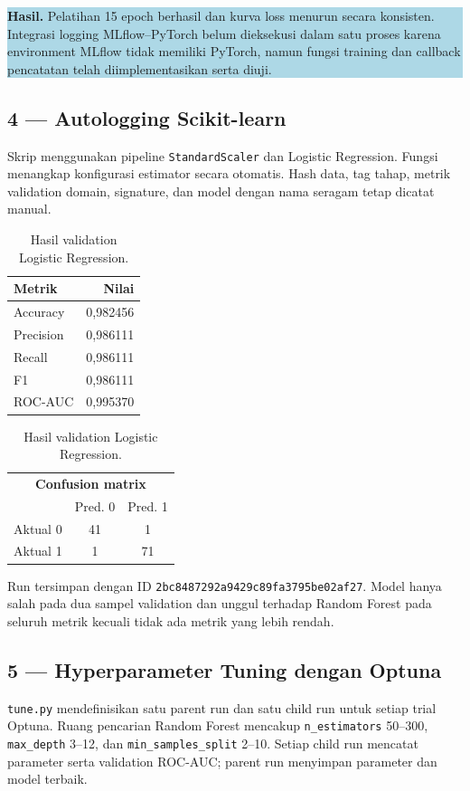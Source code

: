 \documentclass[11pt,a4paper]{article}
\newcommand{\resultbox}[1]{%
  \begin{center}
    \colorbox{lightblue}{\parbox{0.91\linewidth}{\textbf{Hasil.} #1}}
  \end{center}
}
\begin{document}
\resultbox{Pelatihan 15 epoch berhasil dan kurva loss menurun secara konsisten. Integrasi logging MLflow--PyTorch belum dieksekusi dalam satu proses karena environment MLflow tidak memiliki PyTorch, namun fungsi training dan callback pencatatan telah diimplementasikan serta diuji.}

\subsection{4 --- Autologging Scikit-learn}

Skrip  menggunakan pipeline \texttt{StandardScaler} dan Logistic Regression. Fungsi  menangkap konfigurasi estimator secara otomatis. Hash data, tag tahap, metrik validation domain, signature, dan model dengan nama seragam tetap dicatat manual.

\begin{table}[ht]
\centering
\caption{Hasil validation Logistic Regression.}
\begin{tabular}{lr}
\toprule
Metrik & Nilai \\
\midrule
Accuracy & 0,982456 \\
Precision & 0,986111 \\
Recall & 0,986111 \\
F1 & 0,986111 \\
ROC-AUC & 0,995370 \\
\bottomrule
\end{tabular}
\hspace{1.3cm}
\begin{tabular}{c|cc}
\multicolumn{3}{c}{\textbf{Confusion matrix}} \\
 & Pred. 0 & Pred. 1 \\
\hline
Aktual 0 & 41 & 1 \\
Aktual 1 & 1 & 71 \\
\end{tabular}
\end{table}

Run tersimpan dengan ID \texttt{2bc8487292a9429c89fa3795be02af27}. Model hanya salah pada dua sampel validation dan unggul terhadap Random Forest pada seluruh metrik kecuali tidak ada metrik yang lebih rendah.

\subsection{5 --- Hyperparameter Tuning dengan Optuna}

\texttt{tune.py} mendefinisikan satu parent run dan satu child run untuk setiap trial Optuna. Ruang pencarian Random Forest mencakup \texttt{n\_estimators} 50--300, \texttt{max\_depth} 3--12, dan \texttt{min\_samples\_split} 2--10. Setiap child run mencatat parameter serta validation ROC-AUC; parent run menyimpan parameter dan model terbaik.
\end{document}
